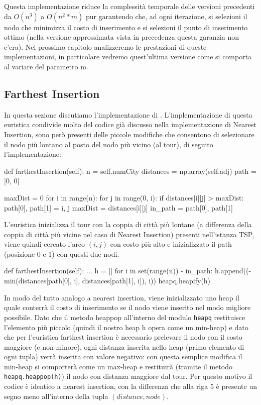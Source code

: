 \documentclass[a4paper,12pt]{report}
\begin{document}
Questa implementazione riduce la complessità temporale delle versioni precedenti da $O(n^3)$ a $O(n^2 * m)$ pur garantendo che, ad ogni iterazione, si selezioni il nodo che minimizza il costo di inserimento e si selezioni il punto di inserimento ottimo (nella versione approssimata vista in precedenza questa garanzia non c'era). \newline
Nel prossimo capitolo analizzeremo le prestazioni di queste implementazioni, in particolare vedremo quest'ultima versione come si comporta al variare del parametro m.


\subsection{Farthest Insertion}
In questa sezione discutiamo l'implementazione di . L'implementazione di questa euristica condivide molto del codice già discusso nella implementazione di Nearest Insertion, sono però presenti delle piccole modifiche che consentono di selezionare il nodo più lontano al posto del nodo più vicino (al tour), di seguito l'implementazione:
\begin{python}
  def farthestInsertion(self):
    n = self.numCity
    distances = np.array(self.adj)
    path = [0, 0]
  
    maxDist = 0
      for i in range(n):
        for j in range(0, i):
          if distances[i][j] > maxDist:
            path[0], path[1] = i, j
            maxDist = distances[i][j]
      in_path = {path[0], path[1]}
  \end{python}
  L'euristica inizializza il tour con la coppia di città più lontane (a differenza della coppia di città più vicine nel caso di Nearest Insertion) presenti nell'istanza TSP, viene quindi cercato l'arco $(i, j)$ con costo più alto e inizializzato il path (posizione 0 e 1) con questi due nodi.
  \begin{python}
  def farthestInsertion(self):
    ...
    h = []
    for i in set(range(n)) - in_path:
      h.append((-min(distances[path[0], i], distances[path[1], i]), i))
    heapq.heapify(h)
  \end{python}
In modo del tutto analogo a nearest insertion, viene inizializzato uno heap il quale conterrà il costo di inserimento se il nodo viene inserito nel modo migliore possibile. Dato che il metodo heappop all'interno del modulo \lstinline!heapq! restituisce l'elemento più piccolo (quindi il nostro heap h opera come un min-heap) e dato che per l'euristica farthest insertion è necessario prelevare il nodo con il costo maggiore (e non minore), ogni distanza inserita nello heap (primo elemento di ogni tupla) verrà inserita con valore negativo: con questa semplice modifica il min-heap si comporterà come un max-heap e restituirà (tramite il metodo \lstinline!heapq.heappop(h)!) il nodo con distanza maggiore dal tour. Per questo motivo il codice è identico a nearest insertion, con la differenza che alla riga 5 è presente un segno meno all'interno della tupla $(distance, node)$.
\end{document}
